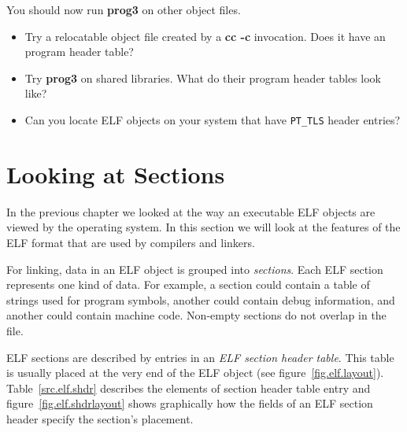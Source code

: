 \documentclass[a4paper,pdftex]{book}
\newcommand{\constant}[1]{\texttt{#1}}
\newcommand{\firstterm}[1]{\textit{#1}}
\newcommand{\tool}[1]{\textbf{#1}}
\begin{document}
You should now run \tool{prog3} on other object files.

\begin{itemize}
\item Try a relocatable object file created by a \tool{cc -c}
  invocation.  Does it have an program header table?
\item Try \tool{prog3} on shared libraries.  What do their program
  header tables look like?
\item Can you locate ELF objects on your system that have
  \constant{PT\_TLS} header entries?
\end{itemize}

\chapter{Looking at Sections}\label{chap.elf-sections}

In the previous chapter we looked at the way an executable ELF objects
are viewed by the operating system.  In this section we will look at
the features of the ELF format that are used by compilers and linkers.

For linking, data in an ELF object is grouped into
\firstterm{sections}.  Each ELF section represents
one kind of data.  For example, a section could contain a table of
strings used for program symbols, another could contain debug
information, and another could contain machine code.  Non-empty
sections do not overlap in the file.%

ELF sections are described by entries in an \firstterm{ELF section
  header table}.  This table is
usually placed at the very end of the ELF object (see
figure~\vref{fig.elf.layout}).  Table~\vref{src.elf.shdr} describes
the elements of section header table entry and
figure~\vref{fig.elf.shdrlayout} shows graphically how the fields of
an ELF section header specify the section's placement.%
\end{document}
